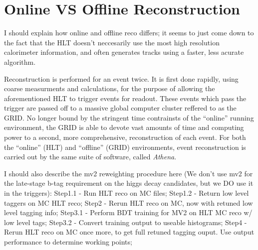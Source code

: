     \section{Online VS Offline Reconstruction}
        I should explain how online and offline reco differs;
            it seems to just come down to the fact that the HLT doesn't neccesarily use the most high resolution calorimeter information,
            and often generates tracks using a faster, less acurate algorithm.

        Reconstruction is performed for an event twice.
        It is first done rapidly, using coarse measurments and calculations,
            for the purpose of allowing the aforementioned HLT to trigger events for readout.
        These events which pass the trigger are passed off to a massive global computer cluster reffered to as the GRID.
        No longer bound by the stringent time contrainsts of the ``online'' running environment,
            the GRID is able to devote vast amounts of time and computing power to a second, 
            more comprehensive, reconstruction of each event.
        For both the ``online'' (HLT) and ``offline'' (GRID) environments, event reconstruction is carried out by the same suite of software,
            called \textit{Athena}.

            
        I should also describe the mv2 reweighting procedure here
            (We don't use mv2 for the late-stage b-tag requirement on the higgs decay candidates,
            but we DO use it in the triggers):
            Step1.1 - Run HLT reco on MC files;
            Step1.2 - Return low level taggers on MC HLT reco;
            Step2   - Rerun HLT reco on MC, now with retuned low level tagging info;
            Step3.1 - Perform BDT training for MV2 on HLT MC reco w/ low level tags;
            Step3.2 - Convert training output to useable histograms;
            Step4   - Rerun HLT reco on MC once more, to get full retuned tagging ouput. Use output performance to determine working points;

